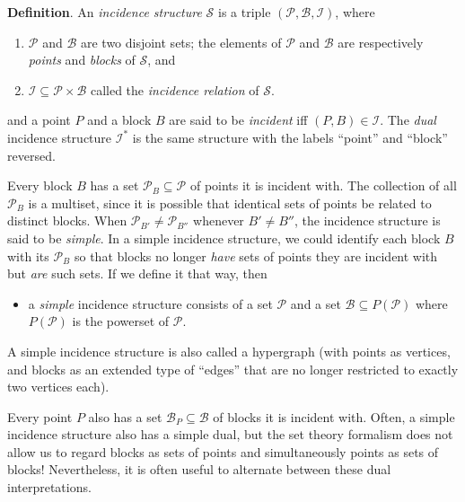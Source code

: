 \documentclass[12pt]{article}
\begin{document}

\textbf{Definition}.  An {\em incidence structure} $\mathcal{S}$ is a triple $(\mathcal{P},\mathcal{B},\mathcal{I})$, where 
\begin{enumerate}
\item $\mathcal{P}$ and $\mathcal{B}$ are two disjoint sets; the elements of $\mathcal{P}$ and $\mathcal{B}$ are respectively {\em points} and {\em blocks} of $\mathcal{S}$, and
\item $\mathcal{I}\subseteq\mathcal{P}\times\mathcal{B}$ called the \emph{incidence relation} of $\mathcal{S}$.
\end{enumerate}
%
and a point $P$ and a block $B$ are said to be {\em incident} iff $(P,B)\in\mathcal{I}$. The {\em dual} incidence structure $\mathcal{I}^*$ is the same structure with the labels ``point'' and ``block'' reversed.

Every block $B$ has a set $\mathcal{P}_B\subseteq \mathcal{P}$ of points it is incident with.  The collection of all $\mathcal{P}_B$ is a multiset, since it is possible that identical sets of points be related to distinct blocks.  When $\mathcal{P}_{B'}\ne\mathcal{P}_{B''}$ whenever $B' \ne B''$, the incidence structure is said to be {\em simple}.  In a simple incidence structure, we could identify each block $B$ with its $\mathcal{P}_B$ so that blocks no longer {\em have\/} sets of points they are incident with but {\em are\/} such sets. If we define it that way, then
\begin{itemize}
\item a {\em simple} incidence structure consists of a set $\mathcal{P}$ and a set $\mathcal{B}\subseteq P(\mathcal{P})$ where $P(\mathcal{P})$ is the powerset of $\mathcal{P}$.
\end{itemize}
A simple incidence structure is also called a hypergraph (with points as vertices, and blocks as an extended type of ``edges'' that are no longer restricted to exactly two vertices each).

Every point $P$ also has a set $\mathcal{B}_P\subseteq \mathcal{B}$ of blocks it is incident with. Often, a simple incidence structure also has a simple dual, but the set theory formalism does not allow us to regard blocks as sets of points and simultaneously points as sets of blocks! Nevertheless, it is often useful to alternate between these dual interpretations.
\end{document}
